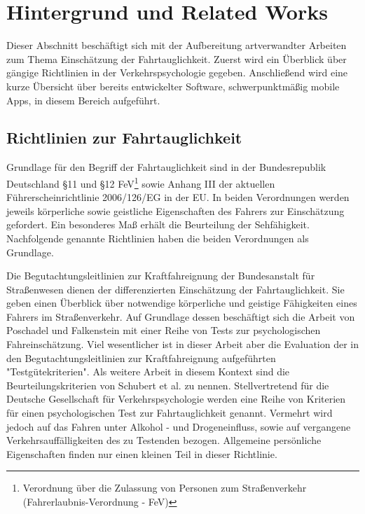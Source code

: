 \section{Hintergrund und Related Works}
\label{relatedWork}
Dieser Abschnitt beschäftigt sich mit der Aufbereitung artverwandter Arbeiten zum Thema Einschätzung der Fahrtauglichkeit. Zuerst wird ein Überblick über gängige Richtlinien in der Verkehrspsychologie gegeben. Anschließend wird eine kurze Übersicht über bereits entwickelter Software, schwerpunktmäßig mobile Apps, in diesem Bereich aufgeführt. 

\subsection{Richtlinien zur Fahrtauglichkeit} 

Grundlage für den Begriff der Fahrtauglichkeit sind in der Bundesrepublik Deutschland \S 11 und \S 12 FeV\footnote{\label{foot:fev}Verordnung über die Zulassung von Personen zum Straßenverkehr (Fahrerlaubnis-Verordnung - FeV)} sowie Anhang III der aktuellen Führerscheinrichtlinie 2006/126/EG in der EU. In beiden Verordnungen werden jeweils körperliche sowie geistliche Eigenschaften des Fahrers zur Einschätzung gefordert. Ein besonderes Maß erhält die Beurteilung der Sehfähigkeit. Nachfolgende genannte Richtlinien haben die beiden Verordnungen als Grundlage.

Die Begutachtungsleitlinien zur Kraftfahreignung der Bundesanstalt für Straßenwesen \cite{begutachtungsrichtlinien} dienen der differenzierten Einschätzung der Fahrtauglichkeit. Sie geben einen Überblick über notwendige körperliche und geistige Fähigkeiten eines Fahrers im Straßenverkehr.
Auf Grundlage dessen beschäftigt sich die Arbeit von Poschadel und Falkenstein \cite{testverfahrenpsychometrischefahreignung} mit einer Reihe von Tests zur psychologischen Fahreinschätzung. Viel wesentlicher ist in dieser Arbeit aber die Evaluation der in den Begutachtungsleitlinien zur Kraftfahreignung \cite{begutachtungsrichtlinien} aufgeführten "Testgütekriterien". Als weitere Arbeit in diesem Kontext sind die Beurteilungskriterien von Schubert et al. \cite{beurteilungskriterien} zu nennen. Stellvertretend für die Deutsche Gesellschaft für Verkehrspsychologie werden eine Reihe von Kriterien für einen psychologischen Test zur Fahrtauglichkeit genannt. Vermehrt wird jedoch auf das Fahren unter Alkohol - und Drogeneinfluss, sowie auf vergangene Verkehrsauffälligkeiten des zu Testenden bezogen. Allgemeine persönliche Eigenschaften finden nur einen kleinen Teil in dieser Richtlinie. 

